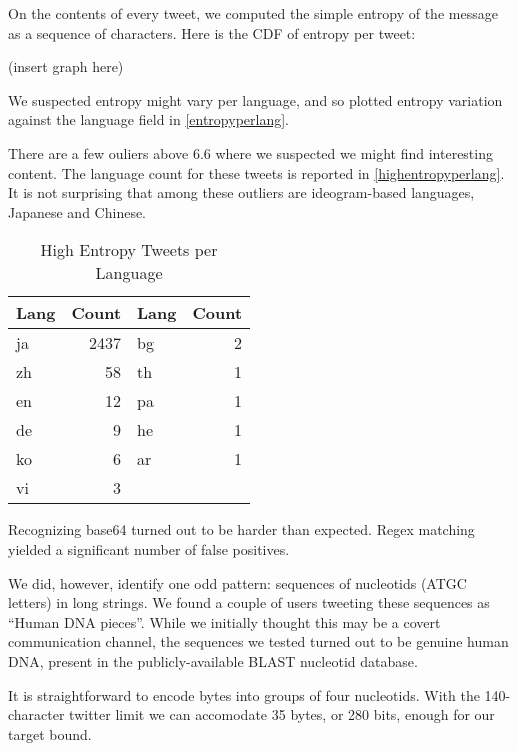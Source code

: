 \documentclass[a4paper,11pt]{article}
\begin{document}
On the contents of every tweet, we computed the simple entropy of the message as a sequence of characters. Here is the CDF of entropy per tweet:

(insert graph here)

We suspected entropy might vary per language, and so plotted entropy variation against the language field in \ref{entropyperlang}.


There are a few ouliers above 6.6 where we suspected we might find interesting content. The language count for these tweets is reported in \ref{highentropyperlang}. It is not surprising that among these outliers are ideogram-based languages, Japanese and Chinese.

\begin{table}
\centering
\begin{tabular}{|l|r||l|r|}
\hline
Lang & Count & Lang & Count \\
\hline
ja  & 2437 &  bg  &    2 \\
zh  & 58 & th   &   1 \\
en   &   12  & pa  &    1 \\
de   &   9 &   he  &    1 \\
ko    &  6 &  ar   &   1 \\
vi   &   3 & & \\
\hline
\end{tabular}
\caption{High Entropy Tweets per Language}
\end{table}

Recognizing base64 turned out to be harder than expected. Regex matching yielded a significant number of false positives.

We did, however, identify one odd pattern: sequences of nucleotids (ATGC letters) in long strings. We found a couple of users tweeting these sequences as ``Human DNA pieces''. While we initially thought this may be a covert communication channel, the sequences we tested turned out to be genuine human DNA, present in the publicly-available BLAST nucleotid database.


It is straightforward to encode bytes into groups of four nucleotids. With the 140-character twitter limit we can accomodate 35 bytes, or 280 bits, enough for our target bound.
\end{document}
